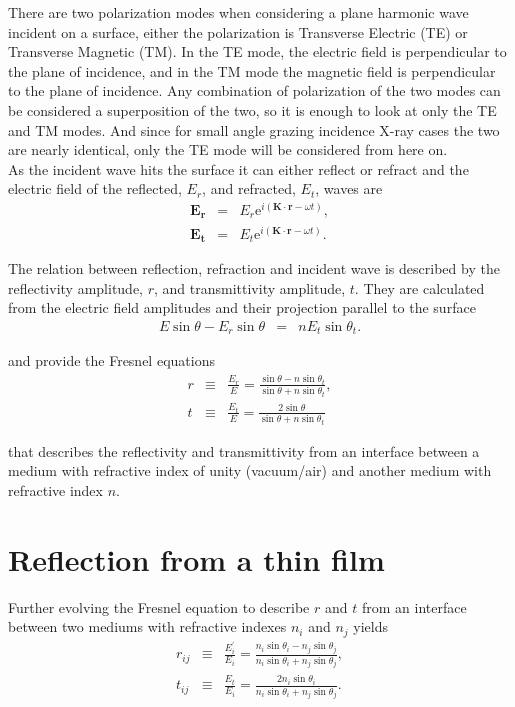 There are two polarization modes when considering a plane harmonic wave incident on a surface, either the polarization is Transverse Electric (TE) or Transverse Magnetic (TM). In the TE mode, the electric field is perpendicular to the plane of incidence, and in the TM mode the magnetic field is perpendicular to the plane of incidence. Any combination of polarization of the two modes can be considered a superposition of the two, so it is enough to look at only the TE and TM modes. And since for small angle grazing incidence X-ray cases the two are nearly identical\cite{pedrotti:1993}, only the TE mode will be considered from here on. \\

As the incident wave hits the surface it can either reflect or refract and the electric field of the reflected, $E_r$, and refracted, $E_t$, waves are
\begin{eqnarray}
	\mathbf{E_r} & =  & E_r \mathrm{e}^{i(\mathbf{K}\cdot \mathbf{r}-\omega t)},\\
	\mathbf{E_t} & =  & E_t \mathrm{e}^{i(\mathbf{K}\cdot \mathbf{r}-\omega t)}.
\end{eqnarray}

The relation between reflection, refraction and incident wave is described by the reflectivity amplitude, $r$, and transmittivity amplitude, $t$. They are calculated from the electric field amplitudes and their projection parallel to the surface
\begin{eqnarray}
	E \sin{\theta} - E_r \sin{\theta} &=& n E_t \sin{\theta_t}.
\end{eqnarray}

and provide the Fresnel equations
\begin{eqnarray}\label{fresneleq}
	r & \equiv & \frac{E_r}{E} = \frac{\sin{\theta}-n \sin{\theta_t}}{\sin{\theta}+n \sin{\theta_t}}, \\
	t & \equiv & \frac{E_t}{E} = \frac{2\sin{\theta}}{\sin{\theta}+n \sin{\theta_t}}
\end{eqnarray}

that describes the reflectivity and transmittivity from an interface between a medium with refractive index of unity (vacuum/air) and another medium with refractive index $n$.

\section{Reflection from a thin film}
Further evolving the Fresnel equation to describe $r$ and $t$ from an interface between two mediums with refractive indexes $n_i$ and $n_j$ yields
\begin{eqnarray}
	r_{ij} & \equiv & \frac{E_i^{'}}{E_i} = \frac{n_i\sin{\theta_i}-n_j \sin{\theta_j}}{n_i\sin{\theta_i}+n_j \sin{\theta_j}}, \label{reflectivitetinterface}\\
	t_{ij} & \equiv & \frac{E_t}{E_i} = \frac{2 n_i\sin{\theta_i}}{n_i\sin{\theta_i}+n_j \sin{\theta_j}}.\label{transmittivity}
\end{eqnarray}

